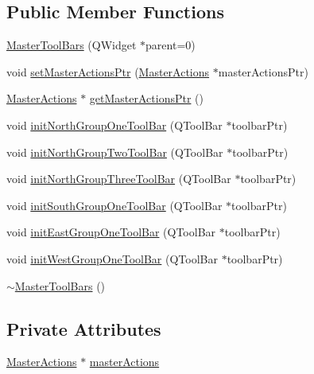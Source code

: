 \subsection*{Public Member Functions}
\begin{DoxyCompactItemize}
\item 
\hyperlink{class_master_tool_bars_a7f863d99c275bf1efe259281eb3245b0}{Master\-Tool\-Bars} (Q\-Widget $\ast$parent=0)
\item 
void \hyperlink{class_master_tool_bars_a8cc2c4f46779f429221b1dee8ad58181}{set\-Master\-Actions\-Ptr} (\hyperlink{class_master_actions}{Master\-Actions} $\ast$master\-Actions\-Ptr)
\item 
\hyperlink{class_master_actions}{Master\-Actions} $\ast$ \hyperlink{class_master_tool_bars_ae73d5e7f4b317e7402ed0b7f6e405fb9}{get\-Master\-Actions\-Ptr} ()
\item 
void \hyperlink{class_master_tool_bars_aec0df27e89d0bbcf5c7b5fc7d2fa8195}{init\-North\-Group\-One\-Tool\-Bar} (Q\-Tool\-Bar $\ast$toolbar\-Ptr)
\item 
void \hyperlink{class_master_tool_bars_a6b77ec9af9c57217657689b6564f1a54}{init\-North\-Group\-Two\-Tool\-Bar} (Q\-Tool\-Bar $\ast$toolbar\-Ptr)
\item 
void \hyperlink{class_master_tool_bars_a058d8e043fc2d5303e21f993c48bc581}{init\-North\-Group\-Three\-Tool\-Bar} (Q\-Tool\-Bar $\ast$toolbar\-Ptr)
\item 
void \hyperlink{class_master_tool_bars_a3f8d953232c3c8ad2205913514a7233e}{init\-South\-Group\-One\-Tool\-Bar} (Q\-Tool\-Bar $\ast$toolbar\-Ptr)
\item 
void \hyperlink{class_master_tool_bars_ad17aa8fcdbbbc16c67075b5b06db146e}{init\-East\-Group\-One\-Tool\-Bar} (Q\-Tool\-Bar $\ast$toolbar\-Ptr)
\item 
void \hyperlink{class_master_tool_bars_a12bb3e3171d9ea6a6c9cd9c7b800e0d7}{init\-West\-Group\-One\-Tool\-Bar} (Q\-Tool\-Bar $\ast$toolbar\-Ptr)
\item 
\hyperlink{class_master_tool_bars_abde16b63edfa107a7125dee5f9c435be}{$\sim$\-Master\-Tool\-Bars} ()
\end{DoxyCompactItemize}
\subsection*{Private Attributes}
\begin{DoxyCompactItemize}
\item 
\hyperlink{class_master_actions}{Master\-Actions} $\ast$ \hyperlink{class_master_tool_bars_a1adde6a67eaa64fbbbf65ffcb8c1590f}{master\-Actions}
\end{DoxyCompactItemize}


